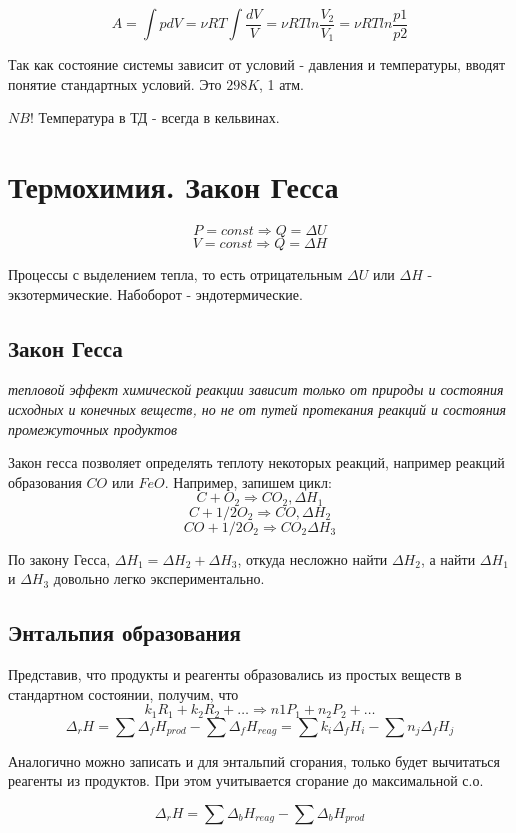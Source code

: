 \documentclass[11pt]{article}
\begin{document}
$$A = \int pdV = \nu RT \int \frac{dV}{V} = \nu RT ln\frac{V_2}{V_1} = \nu RT ln \frac{p1}{p2}$$

Так как состояние системы зависит от условий - давления и температуры, вводят понятие стандартных  условий. Это $298 K$, 1 атм. 

$NB!$ Температура в ТД - всегда в кельвинах.

\section{Термохимия. Закон Гесса}
$$P = const \Rightarrow  Q = \Delta U$$
$$V = const \Rightarrow Q = \Delta H$$

Процессы с выделением тепла, то есть отрицательным $\Delta U$ или $\Delta H$ - экзотермические. Набоборот - эндотермические.

\subsection{Закон Гесса} \emph{тепловой эффект химической реакции зависит только от природы и состояния исходных и конечных веществ, но не от путей протекания реакций и состояния промежуточных продуктов}

Закон гесса позволяет определять теплоту некоторых реакций, например реакций образования $CO$ или $FeO$. Например, запишем цикл: 
$$C+O_2 \Rightarrow CO_2, \Delta H_1$$
$$C+ 1/2 O_2 \Rightarrow CO , \Delta H_2$$
$$CO + 1/2O_2 \Rightarrow CO_2 \Delta H_3$$

По закону Гесса, $\Delta H_1 = \Delta H_2 +\Delta H_3$, откуда несложно найти   $\Delta H_2$, а найти $\Delta H_1$ и $\Delta H_3$ довольно легко экспериментально.

\subsection{Энтальпия образования}

Представив, что продукты и реагенты образовались из простых веществ в стандартном состоянии, получим, что 
$$k_1R_1+k_2R_2+\ldots \Rightarrow n1P_1 + n_2P_2 + \ldots$$
$$\Delta_rH = \sum \Delta_fH_{prod} - \sum \Delta_fH_{reag} = \sum k_i\Delta_fH_i - \sum n_j\Delta_fH_j$$

Аналогично можно записать и для энтальпий сгорания, только будет вычитаться реагенты из продуктов. При этом учитывается сгорание до максимальной с.о.

$$\Delta_rH = \sum \Delta_bH_{reag} - \sum \Delta_bH_{prod}$$
\end{document}
